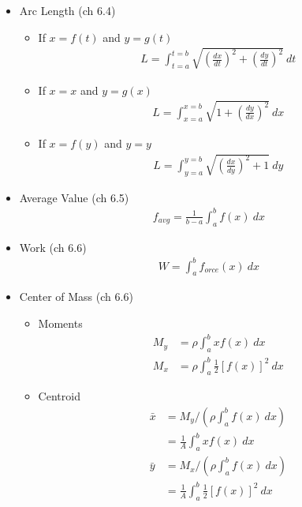 \documentclass{report}
\begin{document}
\begin{multicols}{2}
\begin{itemize}[leftmargin=.25cm]
\item Arc Length (ch 6.4)
\begin{itemize}[leftmargin=.25cm]
\item If $ x = f(t) $ and $ y = g(t) $
\begin{align*}
L = \int_{t=a}^{t=b} \sqrt{ \left( \frac{dx}{dt} \right)^2 + \left( \frac{dy}{dt} \right)^2 } \ dt
\end{align*}

\item If $ x = x $ and $ y = g(x) $
\begin{align*}
L = \int_{x=a}^{x=b} \sqrt{ 1 + \left( \frac{dy}{dx} \right)^2 } \ dx
\end{align*}

\item If $ x = f(y) $ and $ y = y $
\begin{align*}
L = \int_{y=a}^{y=b} \sqrt{ \left( \frac{dx}{dy} \right)^2 + 1 } \ dy
\end{align*}
\end{itemize}




\item Average Value (ch 6.5)
\begin{align*}
f_{avg} = \frac{1}{b-a} \int_a^b f(x) \ dx
\end{align*}




\item Work (ch 6.6)
\begin{align*}
W = \int_a^b f_{orce} (x) \ dx
\end{align*}




\item Center of Mass (ch 6.6)
\begin{itemize}[leftmargin=.25cm]
\item Moments
\begin{align*}
M_y &= \rho \int_a^b x f(x) \ dx \\
M_x &= \rho \int_a^b \frac{1}{2} \left[ f(x) \right]^2 \ dx
\end{align*}
\item Centroid
\begin{align*}
\bar{x} &= M_y / \left(\rho \int_a^b f(x) \ dx \right) \\
&= \frac{1}{A} \int_a^b x f(x) \ dx \\
\bar{y} &= M_x / \left(\rho \int_a^b f(x) \ dx \right) \\
&= \frac{1}{A} \int_a^b \frac{1}{2} \left[ f(x) \right]^2 \ dx
\end{align*}
\end{itemize}





\end{itemize}
\end{multicols}
\end{document}
